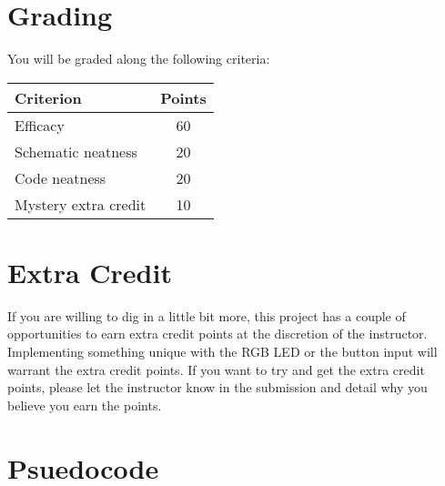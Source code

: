 \section*{Grading}
You will be graded along the following criteria:

\begin{table}
    \begin{tabular}{ l | c }
        \toprule
        Criterion & Points \\

        \midrule
        Efficacy & 60 \\
        Schematic neatness & 20 \\
        Code neatness & 20 \\
        Mystery extra credit & 10 \\

        \bottomrule
    \end{tabular}
\end{table}

\section*{Extra Credit}
If you are willing to dig in a little bit more, this project has a couple of opportunities to earn extra credit points at the discretion of the instructor.
Implementing something unique with the RGB LED or the button input will warrant the extra credit points.
If you want to try and get the extra credit points, please let the instructor know in the submission and detail why you believe you earn the points.

\section*{Psuedocode}

